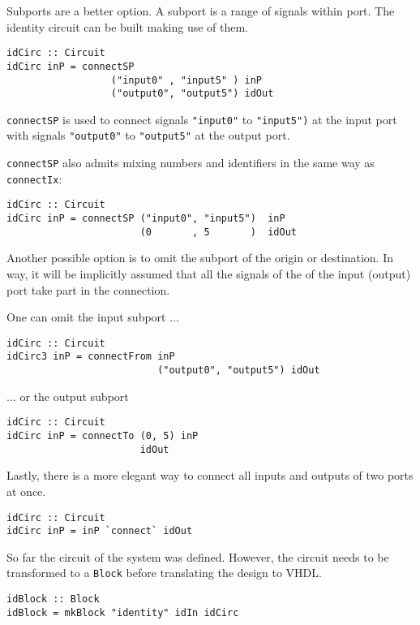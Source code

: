 Subports are a better option. A subport is a range of signals within
port. The identity circuit can be built making use of them.

\begin{lstlisting}
idCirc :: Circuit 
idCirc inP = connectSP 
                  ("input0" , "input5" ) inP        
                  ("output0", "output5") idOut
\end{lstlisting}

\texttt{connectSP} is used to connect signals \texttt{"input0"} to
\texttt{"input5")} at the input port with signals \texttt{"output0"}
to \texttt{"output5"} at the output port.

\texttt{connectSP} also admits mixing numbers and identifiers in the
same way as \texttt{connectIx}:



\begin{lstlisting}
idCirc :: Circuit 
idCirc inP = connectSP ("input0", "input5")  inP
                       (0       , 5       )  idOut
\end{lstlisting}

Another possible option is to omit the subport of the origin or
destination. In way, it will be implicitly assumed that all the
signals of the of the input (output) port take part in the connection.

One can omit the input subport $\dots$
\begin{lstlisting}
idCirc :: Circuit 
idCirc3 inP = connectFrom inP
                          ("output0", "output5") idOut
\end{lstlisting}
$\dots$ or the output subport
\begin{lstlisting}
idCirc :: Circuit 
idCirc inP = connectTo (0, 5) inP
                       idOut

\end{lstlisting}


Lastly, there is a more elegant way to connect all inputs and outputs
of two ports at once.

\begin{lstlisting}
idCirc :: Circuit 
idCirc inP = inP `connect` idOut
\end{lstlisting}


So far the circuit of the system was defined. However, the circuit
needs to be transformed to a \texttt{Block} before translating the
design to VHDL.

\begin{lstlisting}
idBlock :: Block
idBlock = mkBlock "identity" idIn idCirc
\end{lstlisting}

